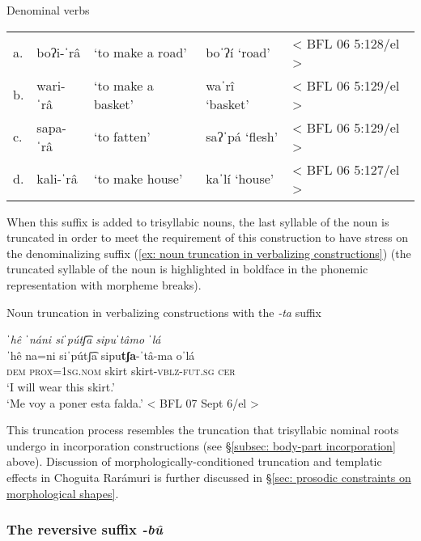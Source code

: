 \ea\label{ex: more examples of verbalizer -ta}
{Denominal verbs}

\begin{tabular}{lllll}
     a. & {boʔi-ˈrâ}&{‘to make a road’}&{boˈʔí} {‘road’}& {< BFL 06 5:128/el >}\\
     b. &{wari-ˈrâ}&{‘to make a basket’}&{waˈrî ‘basket’}&  {< BFL 06 5:129/el >}\\
     c. & {sapa-ˈrâ}&{‘to fatten’}&{saʔˈpá ‘flesh’}& {< BFL 06 5:129/el >}\\
     d. & {kali-ˈrâ}&{`to make house'}&{kaˈlí ‘house’}&{< BFL 06 5:127/el >}\\
\end{tabular}

\z

When this suffix is added to trisyllabic nouns, the last syllable of the noun is truncated in order to meet the requirement of this construction to have stress on the denominalizing suffix (\ref{ex: noun truncation in verbalizing constructions}) (the truncated syllable of the noun is highlighted in boldface in the phonemic representation with morpheme breaks).

\ea\label{ex: noun truncation in verbalizing constructions}
{Noun truncation in verbalizing constructions with the \textit{-ta} suffix}

    {\textit{ˈhê    ˈnáni     siˈpútʃ͡a   sipuˈtâmo    ˈlá}}\\
    \gll    ˈhê   na=ni   siˈpútʃ͡a  sipu\textbf{tʃa}-ˈtâ-ma  oˈlá\\
            \textsc{dem}  \textsc{prox}=1\textsc{sg.nom}  skirt  skirt-\textsc{vblz-fut.sg}  \textsc{cer}\\
    \glt    ‘I will wear this skirt.’\\
    \glt    ‘Me voy a poner esta falda.’  < BFL 07 Sept 6/el >\\

\z

This truncation process resembles the truncation that trisyllabic nominal roots undergo in incorporation constructions (see §\ref{subsec: body-part incorporation} above). Discussion of morpho\-logically-conditioned truncation and templatic effects in Choguita Rarámuri is further discussed in §\ref{sec: prosodic constraints on morphological shapes}.

\subsubsection{The reversive suffix \textit{-bû}}
\label{subsubsec: the reversive -bu suffix}

